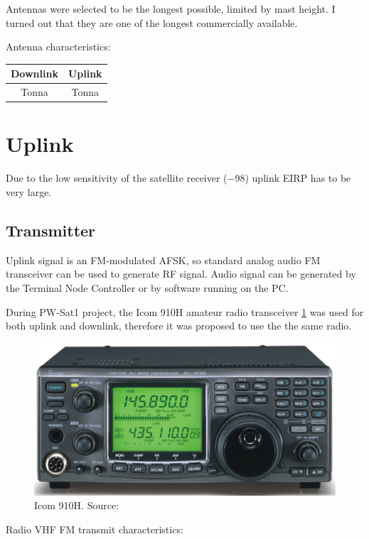 
Antennas were selected to be the longest possible, limited by mast height. I turned out that they are one of the longest commercially available. 

Antenna characteristics:

\begin{tabular}{c|c}
     \textbf{Downlink} & \textbf{Uplink} \\ \hline
     Tonna & Tonna \\
\end{tabular}


\section{Uplink}
Due to the low sensitivity of the satellite receiver (\SI{-98}{\dBm}) uplink EIRP has to be very large.
\subsection{Transmitter}
Uplink signal is an FM-modulated AFSK, so standard analog audio FM transceiver can be used to generate RF signal. Audio signal can be generated by the Terminal Node Controller or by software running on the PC.

During PW-Sat1 project, the Icom 910H amateur radio transceiver \ref{Icom_910H_ref} was used for both uplink and downlink, therefore it was proposed to use the the same radio.

\begin{figure}[H]
    \centering
    \includegraphics[width=0.6\paperwidth]{img/2/icom910h.jpg}
    \caption{Icom 910H. Source: \cite{ICOM_910H_pic}}
    \label{Icom_910H_ref}
\end{figure}

Radio VHF FM transmit characteristics:

